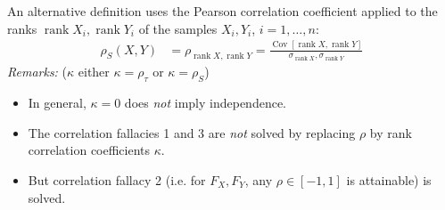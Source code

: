\documentclass[a4paper,landscape,8pt,fleqn]{scrartcl}
\newcommand*\widefbox[1]{\fbox{\hspace{2em}#1\hspace{2em}}}		%
\DeclareMathOperator{\Cov}{Cov}				%
\DeclareMathOperator{\rank}{rank}				%
\begin{document}
\begin{multicols*}{3}
\begin{itemize}
An alternative definition uses the Pearson correlation coefficient applied to the ranks $\rank X_i, \rank Y_i$ of the samples $X_i, Y_i$, $i = 1, \ldots, n$:
\begin{align*}
\rho_S(X,Y) &= \rho_{\rank X, \rank Y} = \frac{\Cov[\rank X, \rank Y]}{\sigma_{\rank X}, \sigma_{\rank Y}}
\end{align*}
\textit{Remarks:} ($\kappa$ either $\kappa = \rho_\tau$ or $\kappa = \rho_S$)
\begin{itemize}
\item In general, $\kappa = 0$ does \textit{not} imply independence.
\item The correlation fallacies 1 and 3 are \textit{not} solved by replacing $\rho$ by rank correlation coefficients $\kappa$.
\item But correlation fallacy 2 (i.e. for $F_X, F_Y$, any $\rho \in [-1,1]$ is attainable) is solved.
\end{itemize}
\end{itemize}


\end{multicols*}
\end{document}

